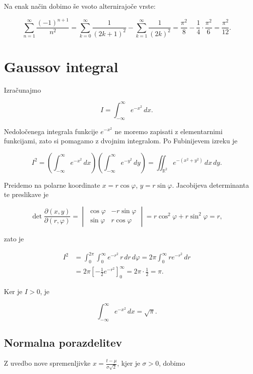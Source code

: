 \documentclass[
  slovene,
]{article}
\begin{document}
Na enak način dobimo še vsoto alternirajoče vrste:

\[\sum_{n=1}^{\infty} \frac{(-1)^{n+1}}{n^2} = \sum_{k=0}^{\infty} \frac{1}{(2k + 1)^2} - \sum_{k=1}^{\infty} \frac{1}{(2k)^2} = \frac{\pi^2}{8} - \frac{1}{4} \cdot \frac{\pi^2}{6} = \frac{\pi^2}{12}.\]

\section{Gaussov integral}\label{gaussov-integral}

Izračunajmo

\[I = \int_{-\infty}^{\infty} e^{-x^2} \, dx.\]

Nedoločenega integrala funkcije \(e^{-x^2}\) ne moremo zapisati z
elementarnimi funkcijami, zato si pomagamo z dvojnim integralom. Po
Fubinijevem izreku je

\[I^2 = \left( \int_{-\infty}^{\infty} e^{-x^2} \, dx \right) \left( \int_{-\infty}^{\infty} e^{-y^2} \, dy \right) = \iint_{\mathbb{R}^2} e^{-(x^2 + y^2)} \, dx \, dy.\]

Preidemo na polarne koordinate \(x = r \cos \varphi\),
\(y = r \sin \varphi\). Jacobijeva determinanta te preslikave je

\[\det \frac{\partial(x, y)}{\partial(r, \varphi)} = \begin{vmatrix} \cos \varphi & -r \sin \varphi \\ \sin \varphi & r \cos \varphi \end{vmatrix} = r \cos^2 \varphi + r \sin^2 \varphi = r,\]

zato je

\[\begin{aligned}
I^2 &= \int_{0}^{2\pi} \int_{0}^{\infty} e^{-r^2} \, r \, dr \, d\varphi
= 2\pi \int_{0}^{\infty} r e^{-r^2} \, dr \\
&= 2\pi \left[ -\frac{1}{2} e^{-r^2} \right]_{0}^{\infty}
= 2\pi \cdot \frac{1}{2}
= \pi.
\end{aligned}\]

Ker je \(I > 0\), je

\[\int_{-\infty}^{\infty} e^{-x^2} \, dx = \sqrt{\pi}.\]

\subsection{Normalna porazdelitev}\label{normalna-porazdelitev}

Z uvedbo nove spremenljivke \(x = \frac{t - \mu}{\sigma \sqrt{2}}\),
kjer je \(\sigma > 0\), dobimo
\end{document}
